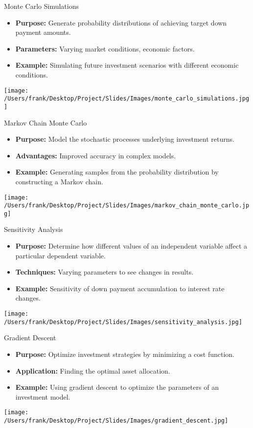 \documentclass{beamer}
\begin{document}
\begin{frame}{Monte Carlo Simulations}
    \begin{itemize}
        \item \textbf{Purpose:} Generate probability distributions of achieving target down payment amounts.
        \item \textbf{Parameters:} Varying market conditions, economic factors.
        \item \textbf{Example:} Simulating future investment scenarios with different economic conditions.
    \end{itemize}
    \centering
    \texttt{[image: /Users/frank/Desktop/Project/Slides/Images/monte\_carlo\_simulations.jpg]}
\end{frame}

\begin{frame}{Markov Chain Monte Carlo}
    \begin{itemize}
        \item \textbf{Purpose:} Model the stochastic processes underlying investment returns.
        \item \textbf{Advantages:} Improved accuracy in complex models.
        \item \textbf{Example:} Generating samples from the probability distribution by constructing a Markov chain.
    \end{itemize}
    \centering
    \texttt{[image: /Users/frank/Desktop/Project/Slides/Images/markov\_chain\_monte\_carlo.jpg]}
\end{frame}

\begin{frame}{Sensitivity Analysis}
    \begin{itemize}
        \item \textbf{Purpose:} Determine how different values of an independent variable affect a particular dependent variable.
        \item \textbf{Techniques:} Varying parameters to see changes in results.
        \item \textbf{Example:} Sensitivity of down payment accumulation to interest rate changes.
    \end{itemize}
    \centering
    \texttt{[image: /Users/frank/Desktop/Project/Slides/Images/sensitivity\_analysis.jpg]}
\end{frame}

\begin{frame}{Gradient Descent}
    \begin{itemize}
        \item \textbf{Purpose:} Optimize investment strategies by minimizing a cost function.
        \item \textbf{Application:} Finding the optimal asset allocation.
        \item \textbf{Example:} Using gradient descent to optimize the parameters of an investment model.
    \end{itemize}
    \centering
    \texttt{[image: /Users/frank/Desktop/Project/Slides/Images/gradient\_descent.jpg]}
\end{frame}
\end{document}
